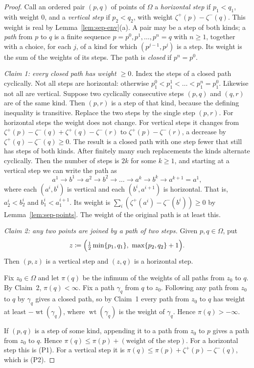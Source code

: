 \documentclass[11pt]{article}
\theoremstyle{definition}\newtheorem{definition}[theorem]{Definition}
\theoremstyle{remark}\newtheorem{remark}[theorem]{Remark}
\begin{document}
\begin{proof}
Call an ordered pair $(p,q)$ of points of $\Omega$ a \emph{horizontal step}
if $p_1<q_1$, with weight $0$, and a \emph{vertical step} if $p_2<q_2$, with
weight $\zeta^+(p)-\zeta^-(q)$. This weight is real by
Lemma~\ref{lem:sep-env}(a). A pair may be a step of both kinds; a
\emph{path} from $p$ to $q$ is a finite sequence
$p=p^0,p^1,\dots,p^n=q$ with $n\ge1$, together with a choice, for each $j$,
of a kind for which $(p^{j-1},p^j)$ is a step. Its weight is the sum of the
weights of its steps. The path is \emph{closed} if $p^n=p^0$.

\emph{Claim 1: every closed path has weight $\ge0$.} Index the steps of a
closed path cyclically. Not all steps are horizontal: otherwise
$p^0_1<p^1_1<\dots<p^n_1=p^0_1$. Likewise not all are vertical. Suppose two
cyclically consecutive steps $(p,q)$ and $(q,r)$ are of the same kind. Then
$(p,r)$ is a step of that kind, because the defining inequality is
transitive. Replace the two steps by the single step $(p,r)$. For horizontal
steps the weight does not change. For vertical steps it changes from
$\zeta^+(p)-\zeta^-(q)+\zeta^+(q)-\zeta^-(r)$ to $\zeta^+(p)-\zeta^-(r)$, a
decrease by $\zeta^+(q)-\zeta^-(q)\ge0$. The result is a closed path with one
step fewer that still has steps of both kinds. After finitely many such
replacements the kinds alternate cyclically. Then the number of steps is
$2k$ for some $k\ge1$, and starting at a vertical step we can write the path
as
\[
 a^1\to b^1\to a^2\to b^2\to\dots\to a^k\to b^k\to a^{k+1}=a^1,
\]
where each $(a^i,b^i)$ is vertical and each $(b^i,a^{i+1})$ is horizontal.
That is, $a^i_2<b^i_2$ and $b^i_1<a^{i+1}_1$. Its weight is
$\sum_i(\zeta^+(a^i)-\zeta^-(b^i))\ge0$ by Lemma~\ref{lem:sep-points}. The
weight of the original path is at least this.

\emph{Claim 2: any two points are joined by a path of two steps.} Given
$p,q\in\Omega$, put
\[
 z\coloneqq\Bigl(\tfrac12\min\{p_1,q_1\},\ \max\{p_2,q_2\}+1\Bigr).
\]
Then $(p,z)$ is a vertical step and $(z,q)$ is a horizontal step.

Fix $z_0\in\Omega$ and let $\pi(q)$ be the infimum of the weights of all
paths from $z_0$ to $q$. By Claim~2, $\pi(q)<\infty$. Fix a path $\gamma_q$
from $q$ to $z_0$. Following any path from $z_0$ to $q$ by $\gamma_q$ gives a
closed path, so by Claim~1 every path from $z_0$ to $q$ has weight at least
$-\operatorname{wt}(\gamma_q)$, where $\operatorname{wt}(\gamma_q)$ is the weight of $\gamma_q$. Hence
$\pi(q)>-\infty$.

If $(p,q)$ is a step of some kind, appending it to a path from $z_0$ to $p$
gives a path from $z_0$ to $q$. Hence $\pi(q)\le\pi(p)+(\text{weight of the
step})$. For a horizontal step this is (P1). For a vertical step it is
$\pi(q)\le\pi(p)+\zeta^+(p)-\zeta^-(q)$, which is (P2).
\end{proof}
\end{document}

